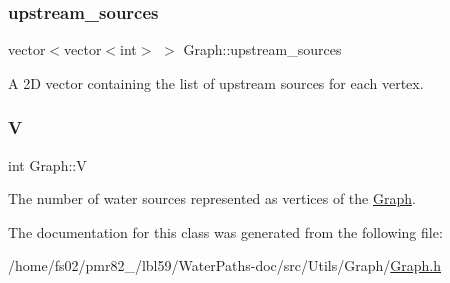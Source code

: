 \mbox{\label{classGraph_a2b9dc8c44ac87d67b061af1bf8dab2fa}} 
\subsubsection{\texorpdfstring{upstream\+\_\+sources}{upstream\_sources}}
{\footnotesize\ttfamily vector$<$vector$<$int$>$ $>$ Graph\+::upstream\+\_\+sources\hspace{0.3cm}{\ttfamily [protected]}}



A 2D vector containing the list of upstream sources for each vertex. 

\mbox{\label{classGraph_a2b722f7cfa7a21e4cb5fae488b3d4dcc}} 
\subsubsection{\texorpdfstring{V}{V}}
{\footnotesize\ttfamily int Graph\+::V\hspace{0.3cm}{\ttfamily [protected]}}



The number of water sources represented as vertices of the \mbox{\hyperlink{classGraph}{Graph}}. 



The documentation for this class was generated from the following file\+:\begin{DoxyCompactItemize}
\item 
/home/fs02/pmr82\+\_/lbl59/\+Water\+Paths-\/doc/src/\+Utils/\+Graph/\mbox{\hyperlink{Graph_8h}{Graph.\+h}}\end{DoxyCompactItemize}
